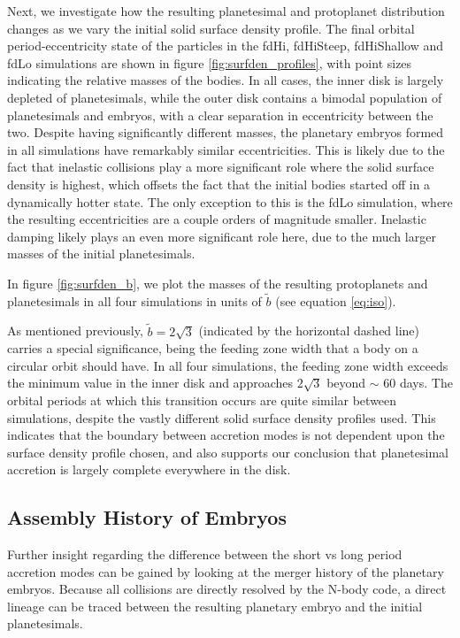 \documentclass[twocolumn]{aastex63}
\begin{document}
Next, we investigate how the resulting planetesimal and protoplanet distribution
changes as we vary the initial solid surface density profile.
The final orbital period-eccentricity state of the
particles in the fdHi, fdHiSteep, fdHiShallow and fdLo simulations are shown in figure \ref{fig:surfden_profiles}, with point sizes 
indicating the relative masses of the bodies. In all cases, the inner disk is largely depleted of planetesimals, while the outer disk 
contains a bimodal population of planetesimals and embryos, with a clear separation in eccentricity between the two. Despite 
having significantly different masses, the planetary embryos formed in all simulations have remarkably similar eccentricities. This 
is likely due to the fact that inelastic collisions play a more significant role where the solid surface density is highest, which 
offsets the fact that the initial bodies started off in a dynamically hotter state. The only exception to this is the fdLo simulation, 
where the resulting eccentricities are a couple orders of magnitude smaller. Inelastic damping likely plays an even more 
significant role here, due to the much larger masses of the initial planetesimals.

In figure \ref{fig:surfden_b}, we plot the masses of the resulting protoplanets and planetesimals in all four simulations in units of $
\tilde{b}$ (see equation \ref{eq:iso}). 

As mentioned previously, $\tilde{b} = 2 \sqrt{3}$ (indicated by the horizontal dashed line) carries a special significance, being the  
feeding zone width that a body on a circular orbit should have. In all four simulations, the feeding zone width exceeds the 
minimum value in the inner disk and approaches $2 \sqrt{3}$ beyond $\sim$ 60 days. The orbital periods at which this transition 
occurs are quite similar between simulations, despite the vastly different solid surface density profiles used. This indicates that 
the boundary between accretion modes is not dependent upon the surface density profile chosen, and also supports our 
conclusion that planetesimal accretion is largely complete everywhere in the disk.

\subsection{Assembly History of Embryos}\label{sec:assembly}

Further insight regarding the difference between the short vs long period accretion modes can be gained by looking at the 
merger history of the planetary embryos. Because all collisions are directly resolved by the N-body code, a direct lineage can be 
traced between the resulting planetary embryo and the initial planetesimals.
\end{document}

